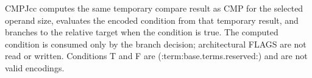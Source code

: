 CMPJcc computes the same temporary compare result as CMP for the selected operand size, evaluates the encoded condition from that temporary result, and branches to the relative target when the condition is true. The computed condition is consumed only by the branch decision; architectural FLAGS are not read or written. Conditions T and F are (:term:base.terms.reserved:) and are not valid encodings.
